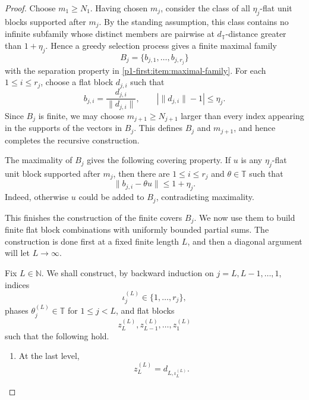 \documentclass[11pt,reqno]{amsart}
\makeatletter
\theoremstyle{plain}
\theoremstyle{definition}
\newcommand{\N}{\mathbb N}
\newcommand{\T}{\mathbb T}
\newcommand{\distT}{d_{\mathbb T}}
\newcounter{problempaper}
\newenvironment{problempaperbody}{%
  \setcounter{subsection}{0}%
  \setcounter{subsubsection}{0}%
  \setcounter{paragraph}{0}%
  \renewcommand{\thesubsection}{\arabic{subsection}}%
  \renewcommand{\thesubsubsection}{\thesubsection.\arabic{subsubsection}}%
  \renewcommand{\theparagraph}{\thesubsubsection.\arabic{paragraph}}%
  \let\problem@outersection\section
  \let\problem@outersubsection\subsection
  \let\problem@outersubsubsection\subsubsection
  \let\problem@outerparagraph\paragraph
  \let\section\problem@papersection
  \let\subsection\problem@papersubsection
  \let\subsubsection\problem@papersubsubsection
}{%
  \let\section\problem@outersection
  \let\subsection\problem@outersubsection
  \let\subsubsection\problem@outersubsubsection
  \let\paragraph\problem@outerparagraph
}
\newcommand{\problem@target}[2]{%
  \hypertarget{problem-\theproblempaper-#1-#2}{}%
}
\newcommand{\problem@paperheading}[3]{%
  \par\bigskip
  \problem@target{#1}{#2}%
  \noindent{\large\bfseries #2.\quad #3\par}%
  \nobreak\smallskip
}
\newcommand{\problem@papersubheading}[3]{%
  \par\medskip
  \problem@target{#1}{#2}%
  \noindent{\normalsize\bfseries #2.\quad #3\par}%
  \nobreak\smallskip
}
\newcommand{\problem@papersubsubheading}[3]{%
  \par\smallskip
  \problem@target{#1}{#2}%
  \noindent{\normalsize\itshape #2.\quad #3.\ }%
}
\def\problem@papersection{%
  \@ifstar{\problem@papersectionstar}{\problem@papersectionnostar}%
}
\def\problem@papersectionstar#1{%
  \par\bigskip\noindent{\large\bfseries #1\par}\nobreak\smallskip
}
\def\problem@papersectionnostar#1{%
  \refstepcounter{subsection}%
  \setcounter{subsubsection}{0}%
  \setcounter{paragraph}{0}%
  \problem@paperheading{section}{\thesubsection}{#1}%
  \problem@writecontentsline{section}{\thesubsection}{#1}%
}
\def\problem@papersubsection{%
  \@ifstar{\problem@papersubsectionstar}{\problem@papersubsectionnostar}%
}
\def\problem@papersubsectionstar#1{%
  \par\medskip\noindent{\normalsize\bfseries #1\par}\nobreak\smallskip
}
\def\problem@papersubsectionnostar#1{%
  \refstepcounter{subsubsection}%
  \setcounter{paragraph}{0}%
  \problem@papersubheading{subsection}{\thesubsubsection}{#1}%
  \problem@writecontentsline{subsection}{\thesubsubsection}{#1}%
}
\def\problem@papersubsubsection{%
  \@ifstar{\problem@papersubsubsectionstar}{\problem@papersubsubsectionnostar}%
}
\def\problem@papersubsubsectionstar#1{%
  \par\smallskip\noindent{\normalsize\itshape #1.\ }%
}
\def\problem@papersubsubsectionnostar#1{%
  \refstepcounter{paragraph}%
  \problem@papersubsubheading{subsubsection}{\theparagraph}{#1}%
  \problem@writecontentsline{subsubsection}{\theparagraph}{#1}%
}
\newcommand{\problem@writecontentsline}[3]{%
  \begingroup
  \protected@write\@auxout{}{%
    \string\problemcontentsentry{\theproblempaper}{#1}{#2}{#3}{\thepage}%
  }%
  \endgroup
}
\newcommand{\problemcontentsentry}[5]{%
  \@ifundefined{problemcontents@#1}{%
    \expandafter\gdef\csname problemcontents@#1\endcsname{}%
  }{}%
  \expandafter\g@addto@macro\csname problemcontents@#1\endcsname{%
    \problemcontentsline{#1}{#2}{#3}{#4}{#5}%
  }%
}
\newcommand{\problemcontentslink}[4]{%
  \hyperlink{problem-#1-#2-#3}{#4}%
}
\newcommand{\problemcontentsline}[5]{%
  \ifstrequal{#2}{section}{%
    \par\noindent
    \problemcontentslink{#1}{#2}{#3}{\makebox[2.5em][l]{#3}#4}%
    \nobreak\dotfill
    \problemcontentslink{#1}{#2}{#3}{#5}\par
  }{%
    \ifstrequal{#2}{subsection}{%
      \par\noindent\hspace*{1.5em}%
      \problemcontentslink{#1}{#2}{#3}{\makebox[3.5em][l]{#3}#4}%
      \nobreak\dotfill
      \problemcontentslink{#1}{#2}{#3}{#5}\par
    }{%
      \par\noindent\hspace*{3em}%
      \problemcontentslink{#1}{#2}{#3}{\makebox[4.5em][l]{#3}#4}%
      \nobreak\dotfill
      \problemcontentslink{#1}{#2}{#3}{#5}\par
    }%
  }%
}
\makeatother
\begin{document}
\begin{problempaperbody}
\begin{proof}
Choose $m_1\geq N_1$. Having chosen $m_j$, consider the class of all $\eta_j$-flat unit blocks supported after $m_j$. By the standing assumption, this class contains no infinite subfamily whose distinct members are pairwise at $\distT$-distance greater than $1+\eta_j$. Hence a greedy selection process gives a finite maximal family
\begin{equation*}
        B_j=\{b_{j,1},\ldots,b_{j,r_j}\}
\end{equation*}
with the separation property in \ref{p1-first:item:maximal-family}. For each $1\leq i\leq r_j$, choose a flat block $d_{j,i}$ such that
\begin{equation}
\label{p1-first:eq:representing-block}
        b_{j,i}=\frac{d_{j,i}}{\|d_{j,i}\|}, \qquad |\|d_{j,i}\|-1|\leq \eta_j.
\end{equation}
Since $B_j$ is finite, we may choose $m_{j+1}\geq N_{j+1}$ larger than every index appearing in the supports of the vectors in $B_j$. This defines $B_j$ and $m_{j+1}$, and hence completes the recursive construction.

The maximality of $B_j$ gives the following covering property. If $u$ is any $\eta_j$-flat unit block supported after $m_j$, then there are $1\leq i\leq r_j$ and $\theta\in\T$ such that
\begin{equation}
\label{p1-first:eq:covering}
        \|b_{j,i}-\theta u\|\leq 1+\eta_j.
\end{equation}
Indeed, otherwise $u$ could be added to $B_j$, contradicting maximality.

This finishes the construction of the finite covers $B_j$. We now use them to build finite flat block combinations with uniformly bounded partial sums. The construction is done first at a fixed finite length $L$, and then a diagonal argument will let $L\to\infty$.

Fix $L\in\N$. We shall construct, by backward induction on $j=L,L-1,\ldots,1$, indices
\begin{equation*}
        \iota_j^{(L)}\in\{1,\ldots,r_j\},
\end{equation*}
phases $\theta_j^{(L)}\in\T$ for $1\leq j<L$, and flat blocks
\begin{equation*}
        z_L^{(L)},z_{L-1}^{(L)},\ldots,z_1^{(L)}
\end{equation*}
such that the following hold.

\begin{enumerate}[label=\textup{(\alph*)}]
\item\label{p1-first:item:last-level} At the last level,
\begin{equation*}
        z_L^{(L)}=d_{L,\iota_L^{(L)}}.
\end{equation*}


\end{enumerate}
\end{proof}
\end{problempaperbody}
\end{document}
